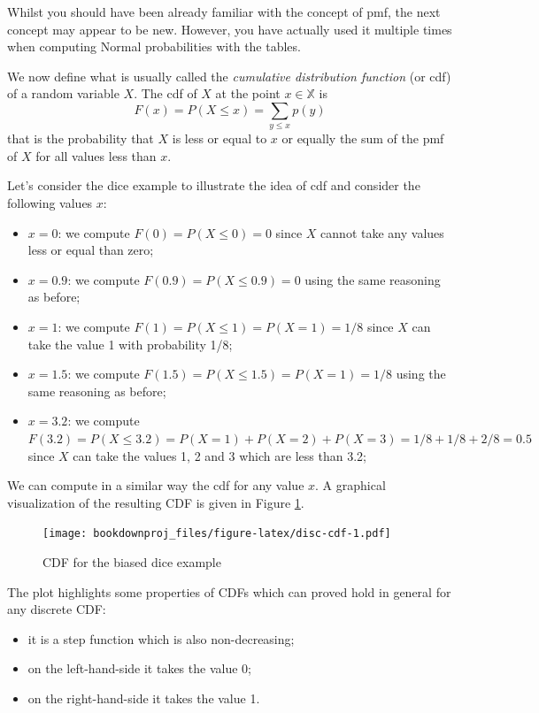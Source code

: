 \documentclass[
]{book}
\theoremstyle{definition}
\theoremstyle{definition}
\theoremstyle{definition}
\theoremstyle{definition}
\theoremstyle{remark}
\begin{document}
Whilst you should have been already familiar with the concept of pmf, the next concept may appear to be new. However, you have actually used it multiple times when computing Normal probabilities with the tables.

We now define what is usually called the \emph{cumulative distribution function} (or cdf) of a random variable \(X\). The cdf of \(X\) at the point \(x\in\mathbb{X}\) is
\[
F(x) = P(X \leq x) = \sum_{y \leq x} p(y)
\]
that is the probability that \(X\) is less or equal to \(x\) or equally the sum of the pmf of \(X\) for all values less than \(x\).

Let's consider the dice example to illustrate the idea of cdf and consider the following values \(x\):

\begin{itemize}
\item
  \(x=0\): we compute \(F(0) = P(X\leq 0 )= 0\) since \(X\) cannot take any values less or equal than zero;
\item
  \(x= 0.9\): we compute \(F(0.9)= P(X\leq 0.9) = 0\) using the same reasoning as before;
\item
  \(x = 1\): we compute \(F(1)= P(X\leq 1) = P(X=1) = 1/8\) since \(X\) can take the value 1 with probability 1/8;
\item
  \(x = 1.5\): we compute \(F(1.5) = P(X\leq 1.5) = P(X=1) = 1/8\) using the same reasoning as before;
\item
  \(x = 3.2\): we compute \(F(3.2)=P(X\leq 3.2)=P(X=1)+ P(X=2) + P(X=3)=1/8 + 1/8 + 2/8 = 0.5\) since \(X\) can take the values 1, 2 and 3 which are less than 3.2;
\end{itemize}

We can compute in a similar way the cdf for any value \(x\). A graphical visualization of the resulting CDF is given in Figure \ref{fig:disc-cdf}.

\begin{figure}
\centering
\texttt{[image: bookdownproj\_files/figure-latex/disc-cdf-1.pdf]}
\caption{\label{fig:disc-cdf}CDF for the biased dice example}
\end{figure}

The plot highlights some properties of CDFs which can proved hold in general for any discrete CDF:

\begin{itemize}
\item
  it is a step function which is also non-decreasing;
\item
  on the left-hand-side it takes the value 0;
\item
  on the right-hand-side it takes the value 1.
\end{itemize}
\end{document}
